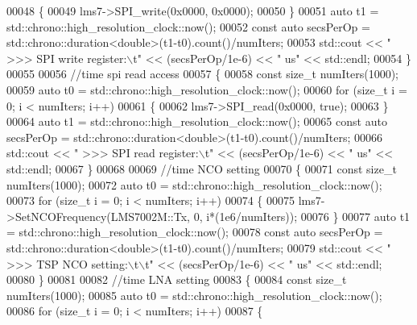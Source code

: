 \begin{DoxyCode}
00048         \{
00049             lms7->SPI\_write(0x0000, 0x0000);
00050         \}
00051         \textcolor{keyword}{auto} t1 = std::chrono::high\_resolution\_clock::now();
00052         \textcolor{keyword}{const} \textcolor{keyword}{auto} secsPerOp = std::chrono::duration<double>(t1-t0).count()/numIters;
00053         std::cout << \textcolor{stringliteral}{"  >>> SPI write register:\(\backslash\)t"} << (secsPerOp/1e-6) << \textcolor{stringliteral}{" us"} << std::endl;
00054     \}
00055 
00056     \textcolor{comment}{//time spi read access}
00057     \{
00058         \textcolor{keyword}{const} \textcolor{keywordtype}{size\_t} numIters(1000);
00059         \textcolor{keyword}{auto} t0 = std::chrono::high\_resolution\_clock::now();
00060         \textcolor{keywordflow}{for} (\textcolor{keywordtype}{size\_t} i = 0; i < numIters; i++)
00061         \{
00062             lms7->SPI\_read(0x0000, \textcolor{keyword}{true});
00063         \}
00064         \textcolor{keyword}{auto} t1 = std::chrono::high\_resolution\_clock::now();
00065         \textcolor{keyword}{const} \textcolor{keyword}{auto} secsPerOp = std::chrono::duration<double>(t1-t0).count()/numIters;
00066         std::cout << \textcolor{stringliteral}{"  >>> SPI read register:\(\backslash\)t"} << (secsPerOp/1e-6) << \textcolor{stringliteral}{" us"} << std::endl;
00067     \}
00068 
00069     \textcolor{comment}{//time NCO setting}
00070     \{
00071         \textcolor{keyword}{const} \textcolor{keywordtype}{size\_t} numIters(1000);
00072         \textcolor{keyword}{auto} t0 = std::chrono::high\_resolution\_clock::now();
00073         \textcolor{keywordflow}{for} (\textcolor{keywordtype}{size\_t} i = 0; i < numIters; i++)
00074         \{
00075             lms7->SetNCOFrequency(LMS7002M::Tx, 0, i*(1e6/numIters));
00076         \}
00077         \textcolor{keyword}{auto} t1 = std::chrono::high\_resolution\_clock::now();
00078         \textcolor{keyword}{const} \textcolor{keyword}{auto} secsPerOp = std::chrono::duration<double>(t1-t0).count()/numIters;
00079         std::cout << \textcolor{stringliteral}{"  >>> TSP NCO setting:\(\backslash\)t\(\backslash\)t"} << (secsPerOp/1e-6) << \textcolor{stringliteral}{" us"} << std::endl;
00080     \}
00081 
00082     \textcolor{comment}{//time LNA setting}
00083     \{
00084         \textcolor{keyword}{const} \textcolor{keywordtype}{size\_t} numIters(1000);
00085         \textcolor{keyword}{auto} t0 = std::chrono::high\_resolution\_clock::now();
00086         \textcolor{keywordflow}{for} (\textcolor{keywordtype}{size\_t} i = 0; i < numIters; i++)
00087         \{

\end{DoxyCode}
